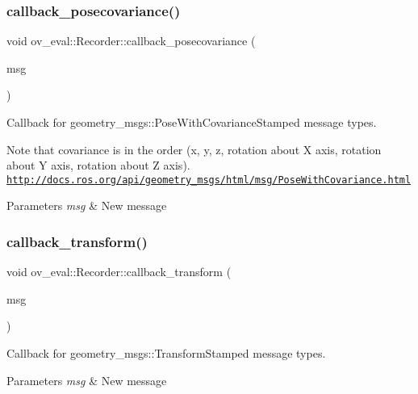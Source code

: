 \subsubsection{\texorpdfstring{callback\+\_\+posecovariance()}{callback\_posecovariance()}}
{\footnotesize\ttfamily void ov\+\_\+eval\+::\+Recorder\+::callback\+\_\+posecovariance (\begin{DoxyParamCaption}\item[{const geometry\+\_\+msgs\+::\+Pose\+With\+Covariance\+Stamped\+Ptr \&}]{msg }\end{DoxyParamCaption})\hspace{0.3cm}{\ttfamily [inline]}}



Callback for geometry\+\_\+msgs\+::\+Pose\+With\+Covariance\+Stamped message types. 

Note that covariance is in the order (x, y, z, rotation about X axis, rotation about Y axis, rotation about Z axis). \href{http://docs.ros.org/api/geometry_msgs/html/msg/PoseWithCovariance.html}{\tt http\+://docs.\+ros.\+org/api/geometry\+\_\+msgs/html/msg/\+Pose\+With\+Covariance.\+html}


\begin{DoxyParams}{Parameters}
{\em msg} & New message \\
\hline
\end{DoxyParams}
\mbox{\label{classov__eval_1_1Recorder_aa98f2bf8b8f3bfc70c905d83a778065b}} 
\subsubsection{\texorpdfstring{callback\+\_\+transform()}{callback\_transform()}}
{\footnotesize\ttfamily void ov\+\_\+eval\+::\+Recorder\+::callback\+\_\+transform (\begin{DoxyParamCaption}\item[{const geometry\+\_\+msgs\+::\+Transform\+Stamped\+Ptr \&}]{msg }\end{DoxyParamCaption})\hspace{0.3cm}{\ttfamily [inline]}}



Callback for geometry\+\_\+msgs\+::\+Transform\+Stamped message types. 


\begin{DoxyParams}{Parameters}
{\em msg} & New message \\
\hline
\end{DoxyParams}
